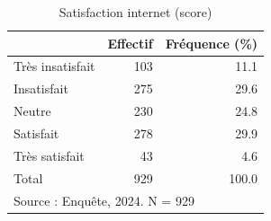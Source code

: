 \begin{table}[htbp]\centering
\def\sym#1{\ifmmode^{#1}\else\(^{#1}\)\fi}
\caption{Satisfaction internet (score)}
\begin{tabular}{l*{2}{r}}
\toprule
            &    Effectif&Fréquence (\%)\\
\midrule
Très insatisfait&         103&        11.1\\
Insatisfait &         275&        29.6\\
Neutre      &         230&        24.8\\
Satisfait   &         278&        29.9\\
Très satisfait&          43&         4.6\\
Total       &         929&       100.0\\
\bottomrule
\multicolumn{3}{l}{\footnotesize Source : Enquête, 2024. N = 929}\\
\end{tabular}
\end{table}

